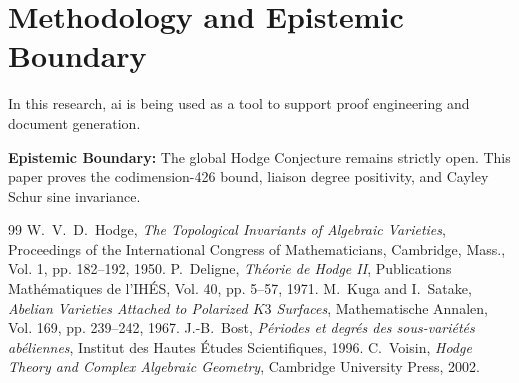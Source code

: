 \documentclass[11pt,a4paper]{article}
\theoremstyle{definition}
\begin{document}
\section{Methodology and Epistemic Boundary}

In this research, ai is being used as a tool to support proof engineering and document generation.

\textbf{Epistemic Boundary:} The global Hodge Conjecture remains strictly open. This paper proves the codimension-426 bound, liaison degree positivity, and Cayley Schur sine invariance.


\begin{thebibliography}{99}
 W.~V.~D.~Hodge, \emph{The Topological Invariants of Algebraic Varieties}, Proceedings of the International Congress of Mathematicians, Cambridge, Mass., Vol. 1, pp. 182--192, 1950.
 P.~Deligne, \emph{Th\'eorie de Hodge II}, Publications Math\'ematiques de l'IH\'ES, Vol. 40, pp. 5--57, 1971.
 M.~Kuga and I.~Satake, \emph{Abelian Varieties Attached to Polarized $K3$ Surfaces}, Mathematische Annalen, Vol. 169, pp. 239--242, 1967.
 J.-B.~Bost, \emph{P\'eriodes et degr\'es des sous-vari\'et\'es ab\'eliennes}, Institut des Hautes \'Etudes Scientifiques, 1996.
 C.~Voisin, \emph{Hodge Theory and Complex Algebraic Geometry}, Cambridge University Press, 2002.
\end{thebibliography}
\end{document}
